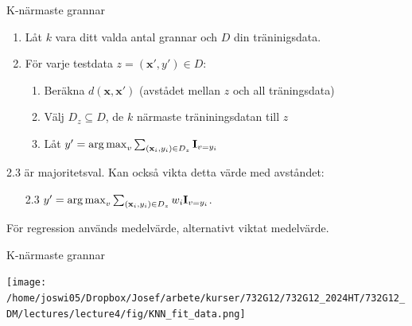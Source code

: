 \documentclass[10pt,english]{beamer}
\begin{document}
\begin{frame}{K-närmaste grannar}
    \begin{enumerate}
        \item Låt $k$ vara ditt valda antal grannar och $D$ din träninigsdata.
        \item För varje testdata $z = (\mathbf{x}', y') \in D$:
        \begin{enumerate}
            \item Beräkna $d(\mathbf{x},\mathbf{x}')$ (avstådet mellan $z$ och all träningsdata)
            \item Välj $D_z \subseteq D$, de $k$ närmaste träniningsdatan till $z$
            \item Låt $y' = \operatorname*{arg\,max}_v \sum_{(\mathbf{x}_i, y_i) \in D_z} \mathbf{I}_{v = y_i}$
        \end{enumerate}
    \end{enumerate}
    2.3 är majoritetsval. Kan också vikta detta värde med avståndet:
    \begin{itemize}
        \item[2.3] $y' = \operatorname*{arg\,max}_{v} \sum_{(\mathbf{x}_i, y_i) \in D_z} w_i \mathbf{I}_{v = y_i}$. 
    \end{itemize}

    För regression används medelvärde, alternativt viktat medelvärde.
\end{frame}

\begin{frame}{K-närmaste grannar}

    \texttt{[image: /home/joswi05/Dropbox/Josef/arbete/kurser/732G12/732G12\_2024HT/732G12\_DM/lectures/lecture4/fig/KNN\_fit\_data.png]}
    
\end{frame}
\end{document}
